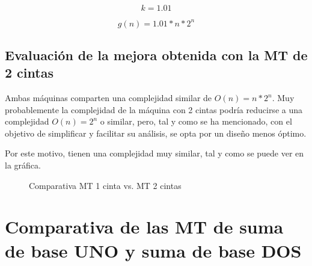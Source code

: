 \documentclass{uc3mpracticas}
\begin{document}
  $$ k = 1.01 $$

  $$g(n) = 1.01 * n * 2^n$$




  \subsection{Evaluación de la mejora obtenida con la MT de 2 cintas}

  Ambas máquinas comparten una complejidad similar de $O(n) = n*2^n$. Muy probablemente la complejidad de la máquina con 2 cintas podría reducirse a una complejidad $O(n) = 2^n$ o similar, pero, tal y como se ha mencionado, con el objetivo de simplificar y facilitar su análisis, se opta por un diseño menos óptimo.

  \vspace{2mm}

  Por este motivo, tienen una complejidad muy similar, tal y como se puede ver en la gráfica.

  \begin{figure}[!h]
    \caption{Comparativa MT 1 cinta vs. MT 2 cintas}
  \end{figure}


  \clearpage

  \section{Comparativa de las MT de suma de base UNO y suma de base DOS}
\end{document}
